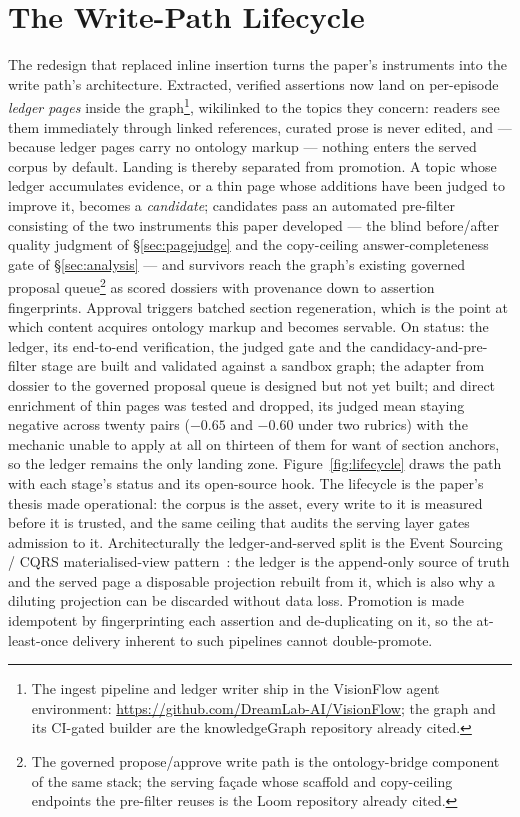 \documentclass[10pt,twocolumn]{article}
\begin{document}
\section{The Write-Path Lifecycle}\label{sec:lifecycle}
The redesign that replaced inline insertion turns the paper's instruments into the write path's
architecture. Extracted, verified assertions now land on per-episode \emph{ledger pages} inside
the graph\footnote{The ingest pipeline and ledger writer ship in the VisionFlow agent
environment: \url{https://github.com/DreamLab-AI/VisionFlow}; the graph and its CI-gated
builder are the knowledgeGraph repository already cited.}, wikilinked to the topics they concern: readers see them immediately through linked
references, curated prose is never edited, and --- because ledger pages carry no ontology
markup --- nothing enters the served corpus by default. Landing is thereby separated from
promotion. A topic whose ledger accumulates evidence, or a thin page whose additions have been
judged to improve it, becomes a \emph{candidate}; candidates pass an automated pre-filter
consisting of the two instruments this paper developed --- the blind before/after quality
judgment of \S\ref{sec:pagejudge} and the copy-ceiling answer-completeness gate of
\S\ref{sec:analysis} --- and survivors reach the graph's existing governed proposal queue\footnote{The governed
propose/approve write path is the ontology-bridge component of the same stack; the serving
fa\c{c}ade whose scaffold and copy-ceiling endpoints the pre-filter reuses is the Loom
repository already cited.} as scored dossiers with provenance down to assertion fingerprints. Approval triggers batched
section regeneration, which is the point at which content acquires ontology markup and becomes
servable. On status: the ledger, its end-to-end verification, the judged gate and the candidacy-and-pre-filter
stage are built and validated against a sandbox graph; the adapter from dossier to the governed
proposal queue is designed but not yet built; and direct enrichment of thin pages was tested and
dropped, its judged mean staying negative across twenty pairs ($-0.65$ and $-0.60$ under two
rubrics) with the mechanic unable to apply at all on thirteen of them for want of section anchors,
so the ledger remains the only landing zone. Figure~\ref{fig:lifecycle} draws the
path with each stage's status and its open-source hook. The lifecycle is the paper's thesis
made operational: the corpus is the asset, every write to it is measured before it is trusted,
and the same ceiling that audits the serving layer gates admission to it. Architecturally the
ledger-and-served split is the Event Sourcing / CQRS materialised-view pattern~\cite{fowler2005eventsourcing}:
the ledger is the append-only source of truth and the served page a disposable projection rebuilt
from it, which is also why a diluting projection can be discarded without data loss. Promotion is
made idempotent by fingerprinting each assertion and de-duplicating on it, so the at-least-once
delivery inherent to such pipelines cannot double-promote.
\end{document}
